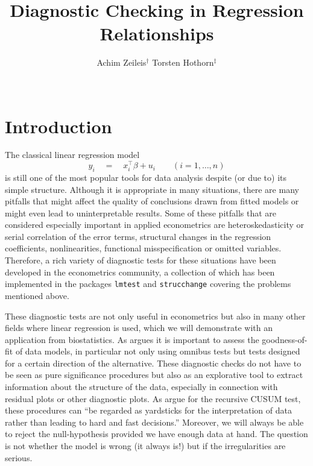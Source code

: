 \documentclass[a4paper]{article}
\begin{document}


\title{Diagnostic Checking in Regression Relationships}
\author{\hfill Achim Zeileis$^\dag$ \hfill Torsten Hothorn$^\ddag$ \hfill \hfill \\
\\
}
\date{}
\maketitle

\section{Introduction}

The classical linear regression model
\begin{equation} \label{eq:model}
y_i \quad = \quad x_i^\top \beta + u_i \qquad (i = 1, \dots, n)
\end{equation}
is still one of the most popular tools for data analysis
despite (or due to) its simple structure. Although it is appropriate in
many situations, there are many pitfalls that might affect the quality
of conclusions drawn from fitted models or might even lead to
uninterpretable results. Some of these pitfalls that are considered especially
important in applied econometrics are heteroskedasticity
or serial correlation of the error terms, structural changes in the
regression coefficients, nonlinearities, functional misspecification
or omitted variables. Therefore,
a rich variety of diagnostic tests for these situations have been developed
in the econometrics community, a collection of which has been
implemented in the packages \texttt{lmtest} and \texttt{strucchange} covering
the problems mentioned above.

These diagnostic tests are not only useful in econometrics but also in many other fields
where linear regression is used, which we will demonstrate with an
application from biostatistics. As \cite{lmtest:Breiman:2001} argues it is important to assess the
goodness-of-fit of data models, in particular not only using omnibus tests
but tests designed for a certain direction of the alternative. These diagnostic
checks do not have to be seen as pure significance procedures but also as an
explorative tool to extract information about the structure of the data, especially in
connection with residual plots or other diagnostic plots. As
\cite{lmtest:Brown+Durbin+Evans:1975} argue for the recursive CUSUM test, these
procedures can ``be regarded as yardsticks for the interpretation of data
rather than leading to hard and fast decisions.'' Moreover, we will always
be able to reject the null-hypothesis provided we have enough data at hand.
The question is not whether the model is wrong (it always is!) but if the
irregularities are serious.
\end{document}
